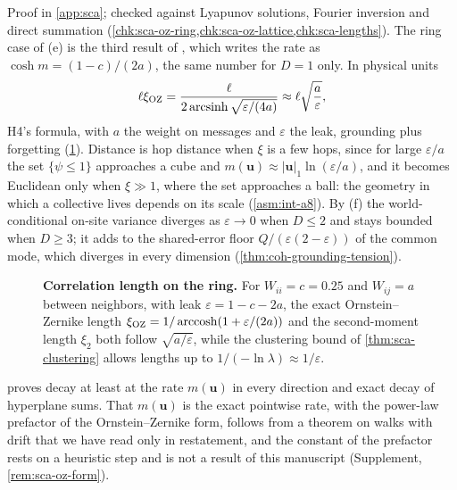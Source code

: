 Proof in \cref{app:sca}; checked against Lyapunov solutions, Fourier inversion and direct summation (\cref{chk:sca-oz-ring,chk:sca-oz-lattice,chk:sca-lengths}). The ring case of (e) is the third result of \citet{dennis2026communicating}, which writes the rate as $\cosh m=(1-c)/(2a)$, the same number for $D=1$ only. In physical units
\begin{equation}\label{eq:sca-xi-physical}
\ell\xi_{\mathrm{OZ}}=\frac{\ell}{2\operatorname{arcsinh}\sqrt{\varepsilon/(4a)}}\approx\ell\sqrt{\frac a\varepsilon},
\end{equation}
H4's formula, with $a$ the weight on messages and $\varepsilon$ the leak, grounding plus forgetting (\cref{fig:sca-oz}). Distance is hop distance when $\xi$ is a few hops, since for large $\varepsilon/a$ the set $\{\psi\le1\}$ approaches a cube and $m(\mathbf u)\approx|\mathbf u|_1\ln(\varepsilon/a)$, and it becomes Euclidean only when $\xi\gg1$, where the set approaches a ball: the geometry in which a collective lives depends on its scale (\cref{asm:int-a8}). By (f) the world-conditional on-site variance diverges as $\varepsilon\to0$ when $D\le2$ and stays bounded when $D\ge3$; it adds to the shared-error floor $Q/(\varepsilon(2-\varepsilon))$ of the common mode, which diverges in every dimension (\cref{thm:coh-grounding-tension}).

\begin{figure}[t]
  \centering
  
  \caption{\textbf{Correlation length on the ring.} For $W_{ii}=c=0.25$ and $W_{ij}=a$ between neighbors, with leak $\varepsilon=1-c-2a$, the exact Ornstein--Zernike length $\xi_{\mathrm{OZ}}=1/\operatorname{arccosh}(1+\varepsilon/(2a))$ and the second-moment length $\xi_2$ both follow $\sqrt{a/\varepsilon}$, while the clustering bound of \cref{thm:sca-clustering} allows lengths up to $1/(-\ln\lambda)\approx1/\varepsilon$.}
  \label{fig:sca-oz}
\end{figure}

 proves decay at least at the rate $m(\mathbf u)$ in every direction and exact decay of hyperplane sums. That $m(\mathbf u)$ is the exact pointwise rate, with the power-law prefactor of the Ornstein--Zernike form, follows from a theorem on walks with drift that we have read only in restatement, and the constant of the prefactor rests on a heuristic step and is not a result of this manuscript (Supplement, \cref{rem:sca-oz-form}).

